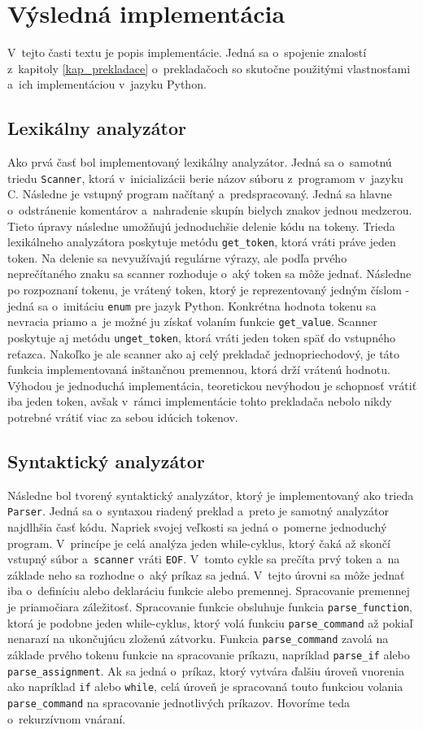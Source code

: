 \section{Výsledná implementácia}
V~tejto časti textu je popis implementácie. Jedná sa o~spojenie znalostí z~kapitoly \ref{kap_prekladace} o~prekladačoch so skutočne použitými vlastnosťami a~ich implementáciou v~jazyku Python.
\subsection{Lexikálny analyzátor}
Ako prvá časť bol implementovaný lexikálny analyzátor. Jedná sa o~samotnú triedu \texttt{Scanner}, ktorá v~inicializácii berie názov súboru z~programom v~jazyku C. Následne je vstupný program načítaný a~predspracovaný. Jedná sa hlavne o~odstránenie komentárov a~nahradenie skupín bielych znakov jednou medzerou. Tieto úpravy následne umožňujú jednoduchšie delenie kódu na tokeny. Trieda lexikálneho analyzátora poskytuje metódu \texttt{get\_token}, ktorá vráti práve jeden token. Na delenie sa nevyužívajú regulárne výrazy, ale podľa prvého neprečítaného znaku sa scanner rozhoduje o~aký token sa môže jednať. Následne po rozpoznaní tokenu, je vrátený token, ktorý je reprezentovaný jedným číslom - jedná sa o~imitáciu \texttt{enum} pre jazyk Python. Konkrétna hodnota tokenu sa nevracia priamo a~je možné ju získať volaním funkcie \texttt{get\_value}. Scanner poskytuje aj metódu \texttt{unget\_token}, ktorá vráti jeden token späť do vstupného reťazca. Nakoľko je ale scanner ako aj celý prekladač jednopriechodový, je táto funkcia implementovaná inštančnou premennou, ktorá drží vrátenú hodnotu. Výhodou je jednoduchá implementácia, teoretickou nevýhodou je schopnosť vrátiť iba jeden token, avšak v~rámci implementácie tohto prekladača nebolo nikdy potrebné vrátiť viac za sebou idúcich tokenov.

\subsection{Syntaktický analyzátor}
Následne bol tvorený syntaktický analyzátor, ktorý je implementovaný ako trieda \texttt{Parser}. Jedná sa o~syntaxou riadený preklad a~preto je samotný analyzátor najdlhšia časť kódu. Napriek svojej veľkosti sa jedná o~pomerne jednoduchý program. V~princípe je celá analýza jeden while-cyklus, ktorý čaká až skončí vstupný súbor a~\texttt{scanner} vráti \texttt{EOF}. V~tomto cykle sa prečíta prvý token a~na základe neho sa rozhodne o~aký príkaz sa jedná. V~tejto úrovni sa môže jednať iba o~definíciu alebo deklaráciu funkcie alebo premennej. Spracovanie premennej je priamočiara záležitosť. Spracovanie funkcie obsluhuje funkcia \texttt{parse\_function}, ktorá je podobne jeden while-cyklus, ktorý volá funkciu \texttt{parse\_command} až pokiaľ nenarazí na ukončujúcu zloženú zátvorku. Funkcia \texttt{parse\_command} zavolá 
na základe prvého tokenu funkcie na spracovanie príkazu, napríklad \texttt{parse\_if} alebo \texttt{parse\_assignment}. Ak sa jedná o~príkaz, ktorý vytvára ďalšiu úroveň vnorenia ako napríklad \texttt{if} alebo \texttt{while}, celá úroveň je spracovaná touto funkciou volania  \texttt{parse\_command} na spracovanie jednotlivých príkazov. Hovoríme teda o~rekurzívnom vnáraní.

